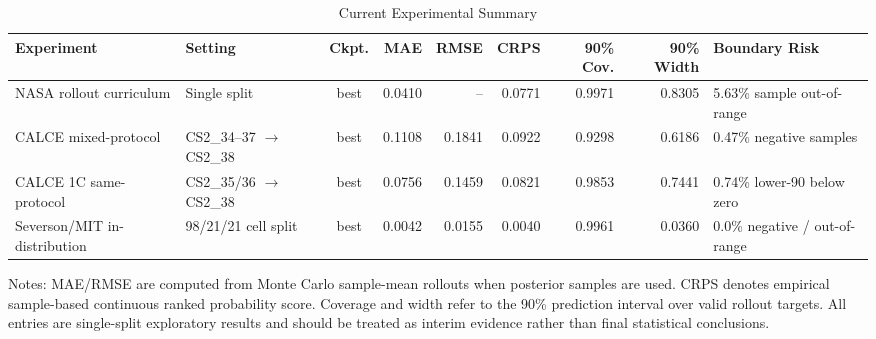 \documentclass[10pt]{article}
\begin{document}
\begin{table}[t]
\centering
\caption*{\huge Current Experimental Summary}
\large
\setlength{\tabcolsep}{4pt}
\renewcommand{\arraystretch}{1.35}
\begin{tabular*}{\textwidth}{@{\extracolsep{\fill}}llcrrrrrl@{}}
\toprule
Experiment & Setting & Ckpt. & MAE & RMSE & CRPS & 90\% Cov. & 90\% Width & Boundary Risk \\
\midrule
NASA rollout curriculum
& Single split
& best
& 0.0410
& --
& 0.0771
& 0.9971
& 0.8305
& 5.63\% sample out-of-range \\

CALCE mixed-protocol
& CS2\_34--37 $\rightarrow$ CS2\_38
& best
& 0.1108
& 0.1841
& 0.0922
& 0.9298
& 0.6186
& 0.47\% negative samples \\

CALCE 1C same-protocol
& CS2\_35/36 $\rightarrow$ CS2\_38
& best
& 0.0756
& 0.1459
& 0.0821
& 0.9853
& 0.7441
& 0.74\% lower-90 below zero \\

Severson/MIT in-distribution
& 98/21/21 cell split
& best
& 0.0042
& 0.0155
& 0.0040
& 0.9961
& 0.0360
& 0.0\% negative / out-of-range \\
\bottomrule
\end{tabular*}

\vspace{1.2em}
\normalsize
\raggedright
Notes: MAE/RMSE are computed from Monte Carlo sample-mean rollouts when posterior samples are used.
CRPS denotes empirical sample-based continuous ranked probability score.
Coverage and width refer to the 90\% prediction interval over valid rollout targets.
All entries are single-split exploratory results and should be treated as interim evidence rather than final statistical conclusions.
\end{table}
\end{document}
